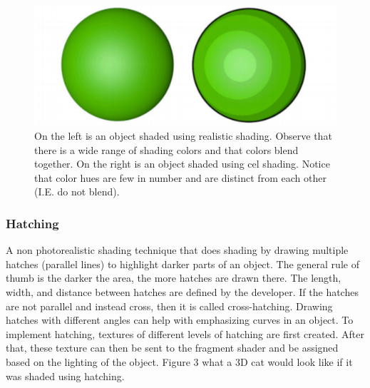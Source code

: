 \documentclass[10pt,journal,compsoc,draftclsnofoot]{IEEEtran}
\begin{document}
\begin{figure} [H]
  \includegraphics[scale=0.5]{two.eps}
  \caption
{ \newline \hspace{\linewidth}
On the left is an object shaded using realistic shading. 
Observe that there is a wide range of shading colors and that colors blend together. 
On the right is an object shaded using cel shading.
Notice that color hues are few in number and are distinct from each other (I.E. do not blend).}
  \label{fig:two}
\end{figure}

\subsubsection{Hatching}
A non photorealistic shading technique that does shading by drawing multiple hatches (parallel lines) to highlight darker parts of an object. 
The general rule of thumb is the darker the area, the more hatches are drawn there. 
The length, width, and distance between hatches are defined by the developer.
If the hatches are not parallel and instead cross, then it is called cross-hatching. \cite{hatch}
Drawing hatches with different angles can help with emphasizing curves in an object.
To implement hatching, textures of different levels of hatching are first created. 
After that, these texture can then be sent to the fragment shader and be assigned based on the lighting of the object.
Figure 3 what a 3D cat would look like if it was shaded using hatching.
\end{document}
